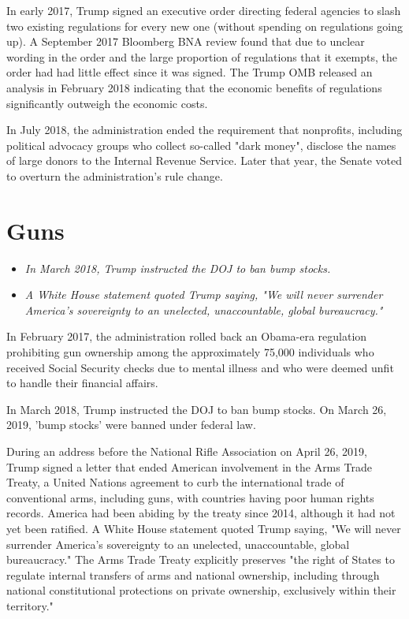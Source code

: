 In early 2017, Trump signed an executive order directing federal
agencies to slash two existing regulations for every new one (without
spending on regulations going up). A September 2017 Bloomberg BNA review
found that due to unclear wording in the order and the large proportion
of regulations that it exempts, the order had had little effect since it
was signed. The Trump OMB released an analysis in February 2018
indicating that the economic benefits of regulations significantly
outweigh the economic costs.

In July 2018, the administration ended the requirement that nonprofits,
including political advocacy groups who collect so-called "dark money",
disclose the names of large donors to the Internal Revenue Service.
Later that year, the Senate voted to overturn the administration's rule
change.

\section{Guns}\label{guns}

\begin{itemize}
\item
  \emph{In March 2018, Trump instructed the DOJ to ban bump stocks.}
\item
  \emph{A White House statement quoted Trump saying, "We will never
  surrender America's sovereignty to an unelected, unaccountable, global
  bureaucracy."}
\end{itemize}

In February 2017, the administration rolled back an Obama-era regulation
prohibiting gun ownership among the approximately 75,000 individuals who
received Social Security checks due to mental illness and who were
deemed unfit to handle their financial affairs.

In March 2018, Trump instructed the DOJ to ban bump stocks. On March 26,
2019, 'bump stocks' were banned under federal law.

During an address before the National Rifle Association on April 26,
2019, Trump signed a letter that ended American involvement in the Arms
Trade Treaty, a United Nations agreement to curb the international trade
of conventional arms, including guns, with countries having poor human
rights records. America had been abiding by the treaty since 2014,
although it had not yet been ratified. A White House statement quoted
Trump saying, "We will never surrender America's sovereignty to an
unelected, unaccountable, global bureaucracy." The Arms Trade Treaty
explicitly preserves "the right of States to regulate internal transfers
of arms and national ownership, including through national
constitutional protections on private ownership, exclusively within
their territory."

